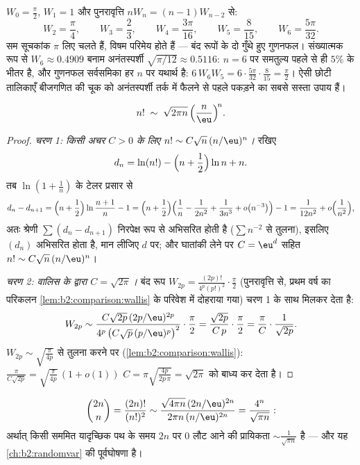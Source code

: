 \begin{example}[पहले कुछ वालिस समाकल]\label{ex:b2:comparison:wallisvalues}
$W_0 = \frac\pi2$, $W_1 = 1$ और पुनरावृत्ति $nW_n =
(n-1)W_{n-2}$ से:
\[
W_2 = \frac\pi4, \qquad
W_3 = \frac23, \qquad
W_4 = \frac{3\pi}{16}, \qquad
W_5 = \frac{8}{15}, \qquad
W_6 = \frac{5\pi}{32}.
\]
सम सूचकांक $\pi$ लिए चलते हैं, विषम परिमेय होते हैं --- बंद रूपों के दो
गुँथे हुए गुणनफल। संख्यात्मक रूप से $W_6
\approx 0.4909$ बनाम अनंतस्पर्शी $\sqrt{\pi/12} \approx 0.5116$: $n = 6$ पर
समतुल्य पहले से ही $5\%$ के भीतर है, और गुणनफल सर्वसमिका हर $n$ पर यथार्थ
है: $6\,W_6W_5 = 6\cdot\frac{5\pi}{32}\cdot\frac8{15} =
\frac\pi2$। ऐसी छोटी तालिकाएँ बीजगणित की चूक को अनंतस्पर्शी तर्क में फैलने
से पहले पकड़ने का सबसे सस्ता उपाय हैं।
\end{example}

\begin{theorem}[स्टर्लिंग]\label{thm:b2:comparison:stirling}
\[
n! \;\sim\; \sqrt{2\pi n}\, \Bigl(\frac{n}{\eu}\Bigr)^{\!n}
.\index{स्टर्लिंग सूत्र}
\]
\end{theorem}

\begin{proof}
\emph{चरण 1: किसी अचर $C >
0$ के लिए $n! \sim C \sqrt n\, (n/\eu)^n$।} रखिए
\[
d_n = \ln(n!) - \Bigl(n + \frac12\Bigr)\ln n + n .
\]
तब $\ln(1 + \frac1n)$ के टेलर प्रसार से
\[
d_n - d_{n+1}
= \Bigl(n + \frac12\Bigr) \ln\frac{n+1}{n} - 1
= \Bigl(n + \frac12\Bigr)\Bigl(\frac1n - \frac{1}{2n^2} +
\frac{1}{3n^3} + o\bigl(n^{-3}\bigr)\Bigr) - 1
= \frac{1}{12n^2} + o\Bigl(\frac{1}{n^2}\Bigr),
\]
अतः श्रेणी $\sum (d_n
- d_{n+1})$ निरपेक्ष रूप से अभिसरित होती है ($\sum
n^{-2}$ से तुलना), इसलिए
$(d_n)$ अभिसरित होता है, मान लीजिए $d$ पर; और घातांकी लेने पर $C = \eu^{d}$ सहित
$n! \sim
C\sqrt n\,(n/\eu)^n$।

\emph{चरण 2: वालिस के द्वारा $C = \sqrt{2\pi}$।} बंद रूप $W_{2p}
= \frac{(2p)!}{4^p (p!)^2}\cdot\frac\pi2$ (पुनरावृत्ति से, प्रथम
वर्ष का परिकलन \cref{lem:b2:comparison:wallis} के परिवेश में दोहराया गया) चरण 1 के साथ मिलकर देता
है:
\[
W_{2p} \sim \frac{C\sqrt{2p}\,(2p/\eu)^{2p}}
{4^p\,\bigl(C\sqrt p\,(p/\eu)^p\bigr)^2}\cdot\frac{\pi}{2}
= \frac{\sqrt{2p}}{C\,p}\cdot\frac{\pi}{2}
= \frac{\pi}{C}\cdot\frac{1}{\sqrt{2p}} .
\]
$W_{2p} \sim \sqrt{\frac{\pi}{4p}}$ से तुलना करने पर (\cref{lem:b2:comparison:wallis}): $\frac{\pi}{C\sqrt{2p}} =
\sqrt{\frac{\pi}{4p}}\,(1 + o(1))$ $C = \pi
\sqrt{\frac{4p}{2p\,\pi}} = \sqrt{2\pi}$ को बाध्य कर देता है।
\end{proof}

\begin{example}[केंद्रीय द्विपद गुणांक]\label{ex:b2:comparison:centralbinomial}
\[
\binom{2n}{n} = \frac{(2n)!}{(n!)^2}
\sim \frac{\sqrt{4\pi n}\,(2n/\eu)^{2n}}{2\pi n\,(n/\eu)^{2n}}
= \frac{4^n}{\sqrt{\pi n}} :
\]
अर्थात् किसी सममित यादृच्छिक पथ के समय $2n$ पर $0$ लौट आने की प्रायिकता
$\sim \frac{1}{\sqrt{\pi n}}$ है --- और यह \cref{ch:b2:randomvar} की पूर्वघोषणा है।
\end{example}


